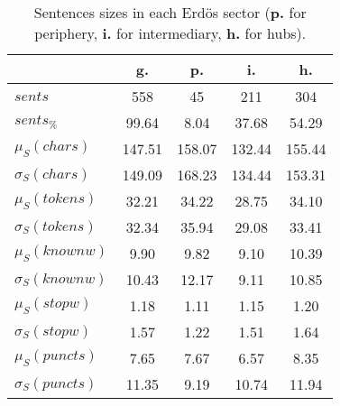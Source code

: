 \begin{table}[h!]
\begin{center}
\begin{tabular}{| l || c | c | c | c |}\hline
 & {\bf g.} & {\bf p.} & {\bf i.} & {\bf h.} \\\hline\hline
$sents$ & 558  & 45  & 211  & 304 \\
$sents_{\%}$ & 99.64  & 8.04  & 37.68  & 54.29 \\\hline
$\mu_S(chars)$ & 147.51  & 158.07  & 132.44  & 155.44 \\
$\sigma_S(chars)$ & 149.09  & 168.23  & 134.44  & 153.31 \\\hline
$\mu_S(tokens)$ & 32.21  & 34.22  & 28.75  & 34.10 \\
$\sigma_S(tokens)$ & 32.34  & 35.94  & 29.08  & 33.41 \\\hline
$\mu_S(knownw)$ & 9.90  & 9.82  & 9.10  & 10.39 \\
$\sigma_S(knownw)$ & 10.43  & 12.17  & 9.11  & 10.85 \\\hline
$\mu_S(stopw)$ & 1.18  & 1.11  & 1.15  & 1.20 \\
$\sigma_S(stopw)$ & 1.57  & 1.22  & 1.51  & 1.64 \\\hline
$\mu_S(puncts)$ & 7.65  & 7.67  & 6.57  & 8.35 \\
$\sigma_S(puncts)$ & 11.35  & 9.19  & 10.74  & 11.94 \\\hline
\end{tabular}
\caption{Sentences sizes in each Erd\"os sector ({{\bf p.}} for periphery, {{\bf i.}} for intermediary, {{\bf h.}} for hubs).}
\end{center}
\end{table}